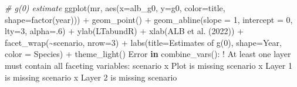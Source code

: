 \documentclass[
]{book}
\newenvironment{Shaded}{\begin{snugshade}}{\end{snugshade}}
\newcommand{\AttributeTok}[1]{\textcolor[rgb]{0.77,0.63,0.00}{#1}}
\newcommand{\CommentTok}[1]{\textcolor[rgb]{0.56,0.35,0.01}{\textit{#1}}}
\newcommand{\ControlFlowTok}[1]{\textcolor[rgb]{0.13,0.29,0.53}{\textbf{#1}}}
\newcommand{\DecValTok}[1]{\textcolor[rgb]{0.00,0.00,0.81}{#1}}
\newcommand{\FunctionTok}[1]{\textcolor[rgb]{0.00,0.00,0.00}{#1}}
\newcommand{\NormalTok}[1]{#1}
\newcommand{\SpecialCharTok}[1]{\textcolor[rgb]{0.00,0.00,0.00}{#1}}
\newcommand{\StringTok}[1]{\textcolor[rgb]{0.31,0.60,0.02}{#1}}
\begin{document}
\begin{Shaded}
\begin{Highlighting}[]
\CommentTok{\# g(0) estimate}
\FunctionTok{ggplot}\NormalTok{(mr,}
       \FunctionTok{aes}\NormalTok{(}\AttributeTok{x=}\NormalTok{alb\_g0, }\AttributeTok{y=}\NormalTok{g0, }
           \AttributeTok{color=}\NormalTok{title, }\AttributeTok{shape=}\FunctionTok{factor}\NormalTok{(year))) }\SpecialCharTok{+}
    \FunctionTok{geom\_point}\NormalTok{() }\SpecialCharTok{+}
    \FunctionTok{geom\_abline}\NormalTok{(}\AttributeTok{slope =} \DecValTok{1}\NormalTok{, }\AttributeTok{intercept =} \DecValTok{0}\NormalTok{, }\AttributeTok{lty=}\DecValTok{3}\NormalTok{, }\AttributeTok{alpha=}\NormalTok{.}\DecValTok{6}\NormalTok{) }\SpecialCharTok{+}
    \FunctionTok{ylab}\NormalTok{(}\StringTok{\textquotesingle{}LTabundR\textquotesingle{}}\NormalTok{) }\SpecialCharTok{+} \FunctionTok{xlab}\NormalTok{(}\StringTok{\textquotesingle{}ALB et al. (2022)\textquotesingle{}}\NormalTok{) }\SpecialCharTok{+}
  \FunctionTok{facet\_wrap}\NormalTok{(}\SpecialCharTok{\textasciitilde{}}\NormalTok{scenario, }\AttributeTok{nrow=}\DecValTok{3}\NormalTok{) }\SpecialCharTok{+} 
  \FunctionTok{labs}\NormalTok{(}\AttributeTok{title=}\StringTok{\textquotesingle{}Estimates of g(0)\textquotesingle{}}\NormalTok{, }
       \AttributeTok{shape=}\StringTok{\textquotesingle{}Year\textquotesingle{}}\NormalTok{, }\AttributeTok{color =} \StringTok{\textquotesingle{}Species\textquotesingle{}}\NormalTok{) }\SpecialCharTok{+} 
  \FunctionTok{theme\_light}\NormalTok{()}
\NormalTok{Error }\ControlFlowTok{in} \StringTok{\textasciigrave{}}\AttributeTok{combine\_vars()}\StringTok{\textasciigrave{}}\SpecialCharTok{:}
\SpecialCharTok{!}\NormalTok{ At least one layer must contain all faceting variables}\SpecialCharTok{:} \StringTok{\textasciigrave{}}\AttributeTok{scenario}\StringTok{\textasciigrave{}}
\NormalTok{x Plot is missing }\StringTok{\textasciigrave{}}\AttributeTok{scenario}\StringTok{\textasciigrave{}}
\NormalTok{x Layer }\DecValTok{1}\NormalTok{ is missing }\StringTok{\textasciigrave{}}\AttributeTok{scenario}\StringTok{\textasciigrave{}}
\NormalTok{x Layer }\DecValTok{2}\NormalTok{ is missing }\StringTok{\textasciigrave{}}\AttributeTok{scenario}\StringTok{\textasciigrave{}}
\end{Highlighting}
\end{Shaded}

~
\end{document}
